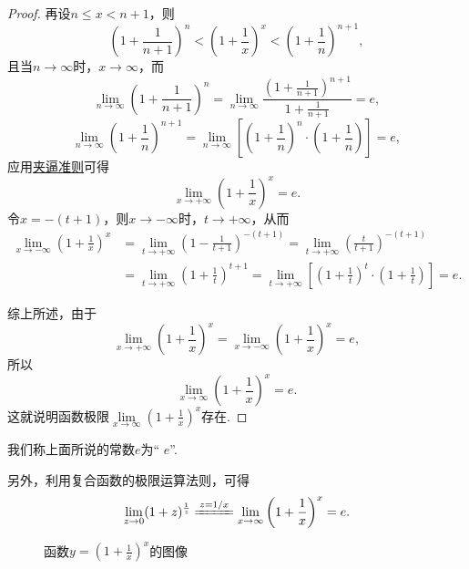 \begin{example}[重要极限II]
\begin{proof}
再设\(n \leq x < n+1\)，则\[
\left(1+\frac{1}{n+1}\right)^n < \left(1+\frac{1}{x}\right)^x < \left(1+\frac{1}{n}\right)^{n+1},
\]且当\(n\to\infty\)时，\(x\to\infty\)，而\[
\lim\limits_{n\to\infty}\left(1+\frac{1}{n+1}\right)^n
=\lim\limits_{n\to\infty}\frac{\left(1+\frac{1}{n+1}\right)^{n+1}}{1+\frac{1}{n+1}} = e,
\]\[
\lim\limits_{n\to\infty}\left(1+\frac{1}{n}\right)^{n+1}
=\lim\limits_{n\to\infty}\left[\left(1+\frac{1}{n}\right)^n\cdot\left(1+\frac{1}{n}\right)\right]=e,
\]应用\hyperref[theorem:极限.夹逼准则]{夹逼准则}可得\[
\lim\limits_{x\to+\infty}\left(1+\frac{1}{x}\right)^x = e.
\]令\(x=-(t+1)\)，则\(x\to-\infty\)时，\(t\to+\infty\)，从而\begin{align*}
\lim\limits_{x\to-\infty}\left(1+\frac{1}{x}\right)^x
&=\lim\limits_{t\to+\infty}\left(1-\frac{1}{t+1}\right)^{-(t+1)}
=\lim\limits_{t\to+\infty}\left(\frac{t}{t+1}\right)^{-(t+1)} \\
&=\lim\limits_{t\to+\infty}\left(1+\frac{1}{t}\right)^{t+1}
=\lim\limits_{t\to+\infty}\left[\left(1+\frac{1}{t}\right)^t\cdot\left(1+\frac{1}{t}\right)\right]=e.
\end{align*}

综上所述，由于\[
\lim\limits_{x\to+\infty}\left(1+\frac{1}{x}\right)^x
= \lim\limits_{x\to-\infty}\left(1+\frac{1}{x}\right)^x
= e,
\]所以\begin{equation}\label{equation:极限.重要极限II}
\lim\limits_{x\to\infty} \left(1+\frac{1}{x}\right)^x = e.
\end{equation}
这就说明函数极限\(\lim\limits_{x\to\infty} \left(1+\frac{1}{x}\right)^x\)存在.
\end{proof}
\end{example}
我们称上面所说的常数\(e\)为“ \(e\)”.

另外，利用复合函数的极限运算法则，可得
\begin{equation}
\lim\limits_{z\to0}(1+z)^{\frac{1}{z}}
\xlongequal{z=1/x}
\lim\limits_{x\to\infty}\left(1+\frac{1}{x}\right)^x
= e.
\end{equation}

\begin{figure}[ht]
\centering
{}
\caption{函数\(y=\left(1+\tfrac{1}{x}\right)^x\)的图像}
\label{figure:极限.函数(1+1/x)^x的图像}
\end{figure}

